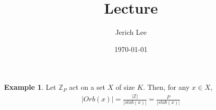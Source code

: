 \documentclass[12pt]{article}
\title{Lecture}
\author{Jerich Lee}
\date{\today}
\theoremstyle{definition} %
\newtheorem{example}{Example}
\theoremstyle{plain} %
\begin{document}
\maketitle
\begin{example}
   Let $\mathbb{{Z}}_P$ act on a set $X$ of size $K$. Then, for any $x\in X$, 
   \begin{align}
    \left\vert Orb(x) \right\vert = \frac{\left\vert \mathbb{{Z}} \right\vert}{\left\vert stab(x) \right\vert } = \frac{P}{\left\vert stab(x) \right\vert }
   \end{align} 
\end{example}
\end{document}
